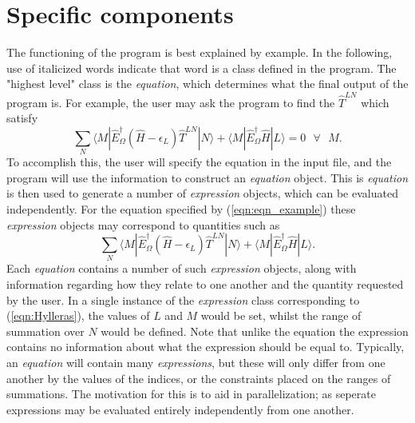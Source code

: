 \section{Specific components}
The functioning of the program is best explained by example. In the following,
use of italicized words indicate that word is a class defined in the program.
The "highest level" class is the \emph{equation}, which determines what the
final output of the program is. For example, the user may ask the program to find the 
$\hat{T}^{LN}$ which satisfy 
\begin{equation}
\sum_{N} 
\langle M | \hat{E}^{\dagger}_{\Omega} (\hat{H}-\epsilon_{L}) \hat{T}^{LN} | N \rangle  +
\langle M | \hat{E}^{\dagger}_{\Omega} \hat{H} | L  \rangle = 0 \text{ \ \ \ \ } \forall \text{ \ \ }  M . 
\label{eqn:eqn_example}
\end{equation}
\noindent To accomplish this, the user will specify the equation in the input file, and the 
program will use the information to construct an \emph{equation} object. This is \emph{equation}
is then used to generate a number of \emph{expression} objects, which can be evaluated independently. 
For the equation specified by (\ref{eqn:eqn_example}) these \emph{expression} objects
may correspond to quantities such as
\begin{equation}
\sum_{N} 
\langle M | \hat{E}^{\dagger}_{\Omega} (\hat{H}-\epsilon_{L}) \hat{T}^{LN} | N \rangle  +
\langle M | \hat{E}^{\dagger}_{\Omega} \hat{H} | L  \rangle.
\label{eqn:Hylleras}
\end{equation}
\noindent Each \emph{equation} contains a number of such \emph{expression} objects, along with
information regarding how they relate to one another and the quantity requested by the user.
In a single instance of the \emph{expression} class corresponding to (\ref{eqn:Hylleras}),
the values of $L$ and $M$  would be set, whilst the range of
summation over $N$ would be defined. Note that unlike the equation the expression
contains no information about what the expression should be equal to.
Typically, an \emph{equation} will contain many \emph{expressions}, but
these will only differ from one another by the values of the indices, or the 
constraints placed on the ranges of summations. The motivation for this is to aid in parallelization;
as seperate expressions may be evaluated entirely independently from one another.\\

